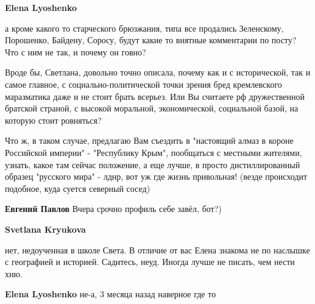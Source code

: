 \begin{itemize}
\begin{itemize}
\textbf{Elena Lyoshenko} 

а кроме какого то старческого брюзжания, типа все продались Зеленскому,
Порошенко, Байдену, Соросу, будут какие то внятные комментарии по посту? Что с
ним не так, и почему он говно? 

Вроде бы, Светлана, довольно точно описала, почему как и с исторической, так и
самое главное, с социально-политической точки зрения бред кремлевского
маразматика даже и не стоит брать всерьез. Или Вы считаете рф дружественной
братской страной, с высокой моральной, экономической, социальной базой, на
которую стоит ровняться? 

Что ж, в таком случае, предлагаю Вам съездить в "настоящий алмаз в короне
Российской империи" - "Республику Крым", пообщаться с местными жителями,
узнать, какое там сейчас положение, а еще лучше, в просто дистиллированный
образец "русского мира" - лднр, вот уж где жизнь привольная! (везде происходит
подобное, куда суется северный сосед)

 

\textbf{Евгений Павлов}
Вчера срочно профиль себе завёл, бот?)

 
\textbf{Svetlana Kryukova} 

нет, недоученная в школе Света. \Laughey[1.0][white] В отличие от вас Елена знакома не по
наслышке с географией и историей. Садитесь, неуд. Иногда лучше не писать, чем
нести хню.


 
\textbf{Elena Lyoshenko} не-а, 3 месяца назад наверное где то

 

\end{itemize}
\end{itemize}

